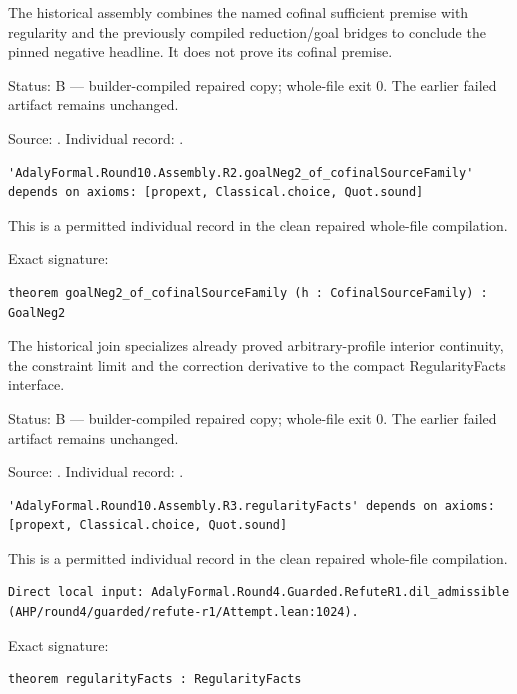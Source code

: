 \begin{theorem}
\label{join-2}
\leanok
The historical assembly combines the named cofinal sufficient premise with regularity and the previously compiled reduction/goal bridges to conclude the pinned negative headline. It does not prove its cofinal premise.
\par Status: B — builder-compiled repaired copy; whole-file exit 0. The earlier failed artifact remains unchanged.
\par Source: \texttt{}. Individual record: \texttt{}.
\begin{verbatim}
'AdalyFormal.Round10.Assembly.R2.goalNeg2_of_cofinalSourceFamily' depends on axioms: [propext, Classical.choice, Quot.sound]
\end{verbatim}
This is a permitted individual record in the clean repaired whole-file compilation.
\par Exact signature:
\begin{verbatim}
theorem goalNeg2_of_cofinalSourceFamily (h : CofinalSourceFamily) : GoalNeg2
\end{verbatim}
\end{theorem}

\begin{theorem}
\label{join-3}
\leanok
The historical join specializes already proved arbitrary-profile interior continuity, the constraint limit and the correction derivative to the compact RegularityFacts interface.
\par Status: B — builder-compiled repaired copy; whole-file exit 0. The earlier failed artifact remains unchanged.
\par Source: \texttt{}. Individual record: \texttt{}.
\begin{verbatim}
'AdalyFormal.Round10.Assembly.R3.regularityFacts' depends on axioms: [propext, Classical.choice, Quot.sound]
\end{verbatim}
This is a permitted individual record in the clean repaired whole-file compilation.
\begin{verbatim}
Direct local input: AdalyFormal.Round4.Guarded.RefuteR1.dil_admissible (AHP/round4/guarded/refute-r1/Attempt.lean:1024).
\end{verbatim}
\par Exact signature:
\begin{verbatim}
theorem regularityFacts : RegularityFacts
\end{verbatim}
\end{theorem}

